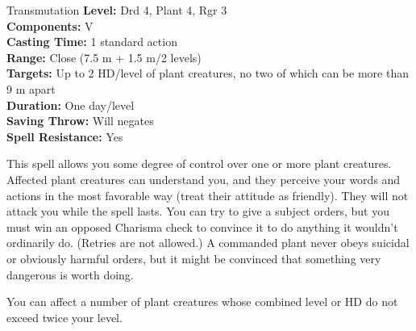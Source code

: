 {Transmutation}
{
	\textbf{Level:}
	Drd 4, Plant 4, Rgr 3\\
	\textbf{Components:}
	V\\
	\textbf{Casting Time:}
	1 standard action\\
	\textbf{Range:}
	Close (7.5 m + 1.5 m/2 levels)\\
	\textbf{Targets:}
	Up to 2 HD/level of plant creatures, no two of which can be more than 9 m apart\\
	\textbf{Duration:}
	One day/level\\
	\textbf{Saving Throw:}
	Will negates\\
	\textbf{Spell Resistance:}
	Yes\\
}
{
	This spell allows you some degree of control over one or more plant creatures. Affected plant creatures can understand you, and they perceive your words and actions in the most favorable way (treat their attitude as friendly). They will not attack you while the spell lasts. You can try to give a subject orders, but you must win an opposed Charisma check to convince it to do anything it wouldn't ordinarily do. (Retries are not allowed.) A commanded plant never obeys suicidal or obviously harmful orders, but it might be convinced that something very dangerous is worth doing.

	You can affect a number of plant creatures whose combined level or HD do not exceed twice your level.

}
